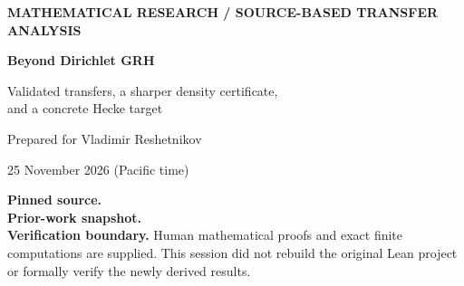 \documentclass[11pt]{article}
\theoremstyle{definition}
\theoremstyle{remark}
\begin{document}
\begin{titlepage}
\vspace*{0.7in}
{\small\bfseries\color{teal} MATHEMATICAL RESEARCH / SOURCE-BASED TRANSFER ANALYSIS\par}
\vspace{0.35in}
{\Huge\bfseries\color{navy} Beyond Dirichlet GRH\par}
\vspace{0.2in}
{\LARGE Validated transfers, a sharper density certificate,\\[3pt]
and a concrete Hecke target\par}
\vspace{0.45in}
{\large Prepared for Vladimir Reshetnikov\par}
{\large 25 November 2026 (Pacific time)\par}
\vspace{0.45in}
\begin{abstract}
\noindent
The useful output of a new proof can include its internal tools, not only
consequences of its final theorem. We inspect the shortened Lean development
of RH and Dirichlet GRH, compare it with 39 earlier ProveIt archives, and
separate proved transfers from missing research steps.

The strongest concrete result is an independently rechecked counterexample,
already present in an incoming ProveIt report, to a published conjecture on
geometric-progression-free subsets of polynomial rings. It works over every
finite field and does not use RH or GRH. We improve its explicit binary
density margin from a guarantee of \(2^{-2^{494}}\) to
\(2^{-2^{476}}\), by replacing a first-moment truncation with a variance
bound. We also derive a hierarchy of kernel-frame moments and rank tails
from the proof's positive-type Fourier estimate. Finally, we give a fully
specified conditional route to RH for
\(\eta(z)\eta(23z)\), together with rigorous obstructions to an automatic
Dirichlet reduction. The new arithmetic estimate required for that route
is not proved here.
\end{abstract}
\vfill
\small
\textbf{Pinned source.}\quad
{}\\
\textbf{Prior-work snapshot.}\quad
{}\\
\textbf{Verification boundary.}\quad
Human mathematical proofs and exact finite computations are supplied.
This session did not rebuild the original Lean project or formally verify
the newly derived results.
\end{titlepage}
\begingroup
\small
\setlength{\parskip}{0pt}
\tableofcontents
\endgroup
\newpage






\clearpage

\end{document}
